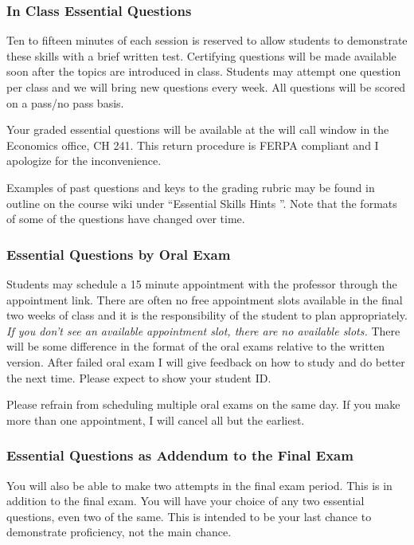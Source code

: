 \documentclass[letterpaper,10pt]{article}
\begin{document}
   
  \subsubsection{In Class Essential Questions}
  
  Ten to fifteen minutes of each session is reserved to allow students to demonstrate these skills with a brief written test. Certifying questions will be made available soon after the topics are introduced in class. Students may attempt one question per class and we will bring new questions every week.  All questions will be scored on a pass/no pass basis. 
  
  Your graded essential questions will be available at the will call window in the Economics office, CH 241.  This return procedure is FERPA compliant and I apologize for the inconvenience.
  
  Examples of past questions and keys to the grading rubric may be found
  in outline on the course wiki under ``Essential Skills Hints ''.  Note that the formats of some of the questions have changed over time.
  
  \subsubsection{Essential Questions by Oral Exam}
  
  Students may schedule a 15 minute appointment with the professor through the appointment link. There are often no free appointment slots available in the final two weeks of class and it is the responsibility of the student to plan appropriately. \emph{If you don’t see an available appointment slot, there are no available slots.} There will be some difference in the format of the oral exams relative to the written version. After failed oral exam I will give feedback on how to study and do better the next time. Please expect to show your student ID.
  
  Please refrain from scheduling multiple oral exams on the same day.  If you make more than one appointment, I will cancel all but the earliest.
  
  \subsubsection{ Essential Questions as Addendum to the Final Exam}
  You will also be able to make two attempts in the final exam period. This is in addition to the final exam. You will have your choice of any two essential questions, even two of the same. This is intended to be your last chance to demonstrate proficiency, not the main chance.
\end{document}
